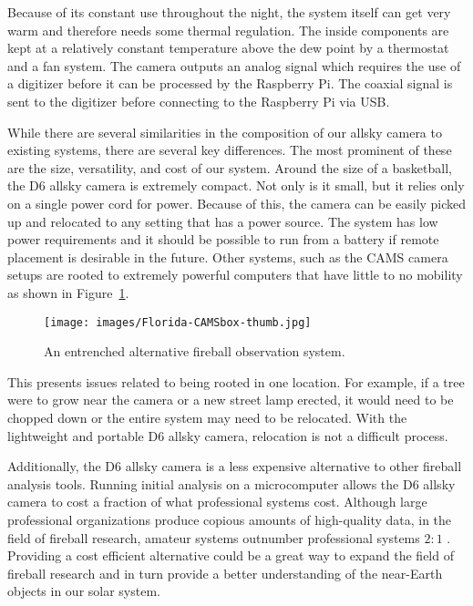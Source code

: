 Because of its constant use throughout the night, the system itself can get very warm and therefore needs some thermal regulation.
The inside components are kept at a relatively constant temperature above the dew point by a thermostat and a fan system.
The camera outputs an analog signal which requires the use of a digitizer before it can be processed by the Raspberry Pi.
The coaxial signal is sent to the digitizer before connecting to the Raspberry Pi via USB.

While there are several similarities in the composition of our allsky camera to existing systems, there are several key differences.
The most prominent of these are the size, versatility, and cost of our system.
Around the size of a basketball, the D6 allsky camera is extremely compact.  
Not only is it small, but it relies only on a single power cord for power.  
Because of this, the camera can be easily picked up and relocated to any setting that has a power source.  
The system has low power requirements and it should be possible to run from a battery if remote placement is desirable in the future.
Other systems, such as the CAMS camera setups are rooted to extremely powerful computers that have little to no mobility as shown in Figure~\ref{immobile}.

\begin{figure}[ht!]
  \centering
  \texttt{[image: images/Florida-CAMSbox-thumb.jpg]}
  \caption{An entrenched alternative fireball observation system.}
  \label{immobile}
\end{figure}

This presents issues related to being rooted in one location.%
For example, if a tree were to grow near the camera or a new street lamp erected, it would need to be chopped down or the entire system may need to be relocated.
With the lightweight and portable D6 allsky camera, relocation is not a difficult process.

Additionally, the D6 allsky camera is a less expensive alternative to other fireball analysis tools.
Running initial analysis on a microcomputer allows the D6 allsky camera to cost a fraction of what professional systems cost.
Although large professional organizations produce copious amounts of high-quality data, in the field of fireball research, amateur systems outnumber professional systems $2:1$ \cite{gural_review_2005}. 
Providing a cost efficient alternative could be a great way to expand the field of fireball research and in turn provide a better understanding of the near-Earth objects in our solar system.


